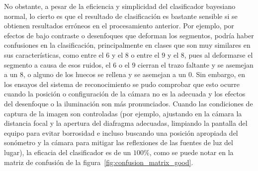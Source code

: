 No obstante, a pesar de la eficiencia y simplicidad del clasificador bayesiano normal, lo cierto es que el resultado de clasificación es bastante sensible si se obtienen resultados erróneos en el procesamiento anterior.
Por ejemplo, por efectos de bajo contraste o desenfoques que deforman los segmentos, podría haber confusiones en la clasificación, principalmente en clases que son muy similares en sus características, como entre el $6$ y el $8$ o entre el $9$ y el $8$, pues al deformarse el segmento a causa de esos ruidos, el $6$ o el $9$ cierran el trazo faltante y se asemejan a un $8$, o alguno de los huecos se rellena y se asemejan a un $0$.
Sin embargo, en los ensayos del sistema de reconocimiento se pudo comprobar que esto ocurre cuando la posición o configuración de la cámara no es la adecuada y los efectos del desenfoque o la iluminación son más pronunciados.
Cuando las condiciones de captura de la imagen son controladas (por ejemplo, ajustando en la cámara la distancia focal y la apertura del diafragma adecuadas, limpiando la pantalla del equipo para evitar borrosidad e incluso buscando una posición apropiada del sonómetro y la cámara para mitigar las reflexiones de las fuentes de luz del lugar), la eficacia del clasificador es de un $100\%$, como se puede notar en la matriz de confusión de la figura~\ref{fig:confusion_matrix_good}.
